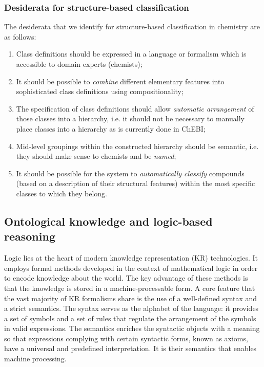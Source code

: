 \documentclass[10pt]{bmc_article}
\newenvironment{bmcformat}{\baselineskip20pt\sloppy\setboolean{publ}{false}}{\baselineskip20pt\sloppy}
\begin{document}
\begin{bmcformat}
\subsubsection*{Desiderata for structure-based classification}
The desiderata that we identify for structure-based classification in chemistry are as follows:
\begin{enumerate}
	\item Class definitions should be expressed in a language or formalism which is accessible to domain experts (chemists);
  \item It should be possible to \textit{combine} different elementary features into sophisticated class definitions using compositionality;	
	\item The specification of class definitions should allow \textit{automatic arrangement} of those classes into a hierarchy, i.e. it should not be necessary to manually place classes into a hierarchy as is currently done in ChEBI;
	\item Mid-level groupings within the constructed hierarchy should be semantic, i.e. they should make sense to chemists and be \textit{named};
	\item It should be possible for the system to \textit{automatically classify} compounds (based on a description of their structural features) within the most specific classes to which they belong. 
\end{enumerate}


\subsection*{Ontological knowledge and logic-based reasoning}
\label{sec:backlogic}

Logic lies at the heart of modern knowledge representation (KR) technologies. It employs formal methods developed in the context of mathematical logic in order to encode knowledge about the world. The key advantage of these methods is that the knowledge is stored in a machine-processable form. A core feature that the vast majority of KR formalisms share is the use of a well-defined syntax and a strict semantics. The syntax serves as the alphabet of the language: it provides a set of symbols and a set of rules that regulate the arrangement of the symbols in valid expressions. The semantics enriches the syntactic objects with a meaning so that expressions complying with certain syntactic forms, known as axioms, have a universal and predefined interpretation. It is their semantics that enables machine processing.


\end{bmcformat}
\end{document}
